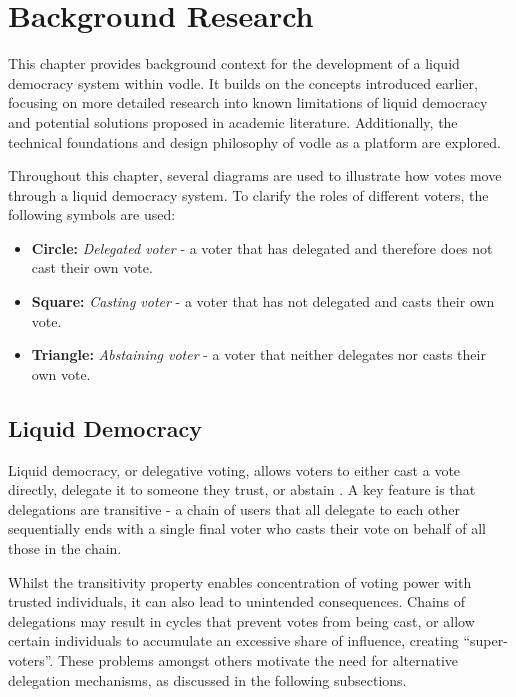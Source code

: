 \chapter{Background Research}
\label{ch:background}
This chapter provides background context for the development of a liquid democracy system within vodle. It builds on the concepts introduced earlier, focusing on more detailed research into known limitations of liquid democracy and potential solutions proposed in academic literature. Additionally, the technical foundations and design philosophy of vodle as a platform are explored.

Throughout this chapter, several diagrams are used to illustrate how votes move through a liquid democracy system. To clarify the roles of different voters, the following symbols are used:
\begin{itemize}
    \item \textbf{Circle: } \textit{Delegated voter} - a voter that has delegated and therefore does not cast their own vote.
    \item \textbf{Square: } \textit{Casting voter} - a voter that has not delegated and casts their own vote.
    \item \textbf{Triangle: } \textit{Abstaining voter} - a voter that neither delegates nor casts their own vote.
\end{itemize}

\section{Liquid Democracy}

Liquid democracy, or delegative voting, allows voters to either cast a vote directly, delegate it to someone they trust, or abstain \citep{blum_liquid_2016}. A key feature is that delegations are transitive - a chain of users that all delegate to each other sequentially ends with a single final voter who casts their vote on behalf of all those in the chain.

Whilst the transitivity property enables concentration of voting power with trusted individuals, it can also lead to unintended consequences. Chains of delegations may result in cycles that prevent votes from being cast, or allow certain individuals to accumulate an excessive share of influence, creating ``super-voters''. These problems amongst others motivate the need for alternative delegation mechanisms, as discussed in the following subsections.

